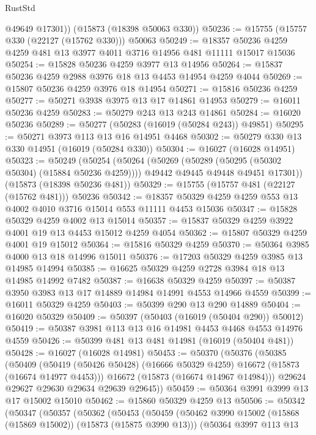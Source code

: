 \begin{lexlean}{RustStd}
\begin{coremodule}
        @49649
        @17301))
    (@15873 (@18398 @50063 @330))
@50236 := @15755 (@15757 @330 (@22127 (@15762 @330))) @50063
@50249 := @18357 @50236 @4259 @4259 @481 @13 @3977 @4011 @3716 @14956 @481 @11111 @15017 @15036
@50254 := @15828 @50236 @4259 @3977 @13 @14956
@50264 := @15837 @50236 @4259 @2988 @3976 @18 @13 @4453 @14954 @4259 @4044
@50269 := @15807 @50236 @4259 @3976 @18 @14954
@50271 := @15816 @50236 @4259
@50277 := @50271 @3938 @3975 @13 @17 @14861 @14953
@50279 := @16011 @50236 @4259
@50283 := @50279 @243 @13 @243 @14861
@50284 := @16020 @50236
@50289 := @50277 (@50283 (@16019 (@50284 @243)) @49851)
@50295 := @50271 @3973 @113 @13 @16 @14951 @4468
@50302 := @50279 @330 @13 @330 @14951 (@16019 (@50284 @330))
@50304 := @16027 (@16028 @14951)
@50323 := @50249
    (@50254
      (@50264
        (@50269 (@50289 (@50295 (@50302 @50304) (@15884 @50236 @4259))))
        @49442
        @49445
        @49448
        @49451
        @17301))
    (@15873 (@18398 @50236 @481))
@50329 := @15755 (@15757 @481 (@22127 (@15762 @481))) @50236
@50342 := @18357 @50329 @4259 @4259 @553 @13 @4002 @4010 @3716 @15014 @553 @11111 @4453 @15036
@50347 := @15828 @50329 @4259 @4002 @13 @15014
@50357 := @15837 @50329 @4259 @3922 @4001 @19 @13 @4453 @15012 @4259 @4054
@50362 := @15807 @50329 @4259 @4001 @19 @15012
@50364 := @15816 @50329 @4259
@50370 := @50364 @3985 @4000 @13 @18 @14996 @15011
@50376 := @17203 @50329 @4259 @3985 @13 @14985 @14994
@50385 := @16625 @50329 @4259 @2728 @3984 @18 @13 @14985 @14992 @7482
@50387 := @16638 @50329 @4259
@50397 := @50387 @3950 @3983 @13 @17 @14889 @14984 @14991 @4553 @14966 @4559
@50399 := @16011 @50329 @4259
@50403 := @50399 @290 @13 @290 @14889
@50404 := @16020 @50329
@50409 := @50397 (@50403 (@16019 (@50404 @290)) @50012)
@50419 := @50387 @3981 @113 @13 @16 @14981 @4453 @4468 @4553 @14976 @4559
@50426 := @50399 @481 @13 @481 @14981 (@16019 (@50404 @481))
@50428 := @16027 (@16028 @14981)
@50453 := @50370
    (@50376
      (@50385
        (@50409
          (@50419 (@50426 @50428) (@16666 @50329 @4259) @16672 (@15873 (@16674 @14977 @4453)))
          @16672
          (@15873 (@16674 @14967 @14984)))
        @29624
        @29627
        @29630
        @29634
        @29639
        @29645))
@50459 := @50364 @3991 @3999 @13 @17 @15002 @15010
@50462 := @15860 @50329 @4259 @13
@50506 := @50342
    (@50347
      (@50357
        (@50362
          (@50453
            (@50459
              (@50462 @3990 @15002 (@15868 (@15869 @15002)) (@15873 (@15875 @3990 @13)))
              (@50364
                @3997
                @113
                @13

\end{coremodule}
\end{lexlean}
